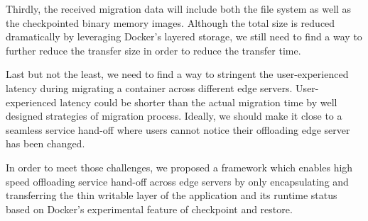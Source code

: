 Thirdly, the received migration data will include both the file system as well as the checkpointed binary memory images. Although the total size is reduced dramatically by leveraging Docker's layered storage, we still need to find a way to further reduce the transfer size in order to reduce the transfer time. 

Last but not the least, we need to find a way to stringent the user-experienced latency during migrating a container across different edge servers. User-experienced latency could be shorter than the actual migration time by well designed strategies of migration process. Ideally, we should make it close to a seamless service hand-off where users cannot notice their offloading edge server has been changed.

In order to meet those challenges, we proposed a framework which enables high speed offloading service hand-off across edge servers by only encapsulating and transferring the thin writable layer of the application and its runtime status based on Docker's  experimental feature of checkpoint and restore.

